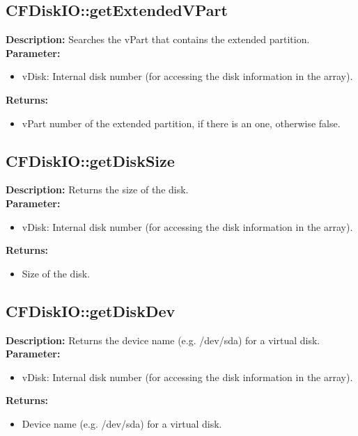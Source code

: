 \subsection{CFDiskIO::getExtendedVPart}
\textbf{Description:} Searches the vPart that contains the extended partition.\\
\textbf{Parameter:}
\begin{itemize}
\item vDisk: Internal disk number (for accessing the disk information in the array).
\end{itemize}
\textbf{Returns:}
\begin{itemize}
\item vPart number of the extended partition, if there is an one, otherwise false.
\end{itemize}

\subsection{CFDiskIO::getDiskSize}
\textbf{Description:} Returns the size of the disk.\\
\textbf{Parameter:}
\begin{itemize}
\item vDisk: Internal disk number (for accessing the disk information in the array).
\end{itemize}
\textbf{Returns:}
\begin{itemize}
\item Size of the disk.
\end{itemize}

\subsection{CFDiskIO::getDiskDev}
\textbf{Description:} Returns the device name (e.g. /dev/sda) for a virtual disk.\\
\textbf{Parameter:}
\begin{itemize}
\item vDisk: Internal disk number (for accessing the disk information in the array).
\end{itemize}
\textbf{Returns:}
\begin{itemize}
\item Device name (e.g. /dev/sda) for a virtual disk.
\end{itemize}

